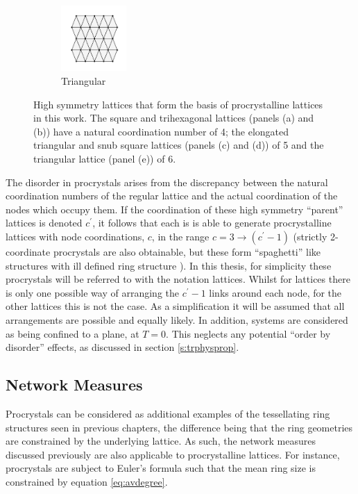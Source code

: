\begin{figure}[bt]
     \vspace{2mm}
     \begin{subfigure}[b]{0.3\textwidth}
         \centering
         \includegraphics[height=2.5cm]{./figures/procrystals/tri.pdf}
         \caption{Triangular}
         \label{fig:symlattri}
     \end{subfigure}
     \hfill

     \caption{High symmetry lattices that form the basis of \td{} procrystalline lattices in this work. The square and trihexagonal lattices (panels (a) and (b)) have a natural coordination number of 4; the elongated triangular and snub square lattices (panels (c) and (d))  of 5 and the triangular lattice (panel (e)) of 6.}
     \label{fig:symlat}
\end{figure}

The disorder in procrystals arises from the discrepancy between the natural coordination numbers of the regular lattice and the actual coordination of the nodes which occupy them.
If the coordination of these high symmetry ``parent'' lattices is denoted $c^\prime$, it follows that each is is able to generate procrystalline lattices with node coordinations, $c$, in the range $c=3\rightarrow \left(c^\prime-1\right)$ (strictly 2\--coordinate procrystals are also obtainable, but these form ``spaghetti'' like structures with ill defined ring structure \cite{Baise2018}).
In this thesis, for simplicity these procrystals will be referred to with the notation lattices.
Whilst for lattices there is only one possible way of arranging the $c^\prime-1$ links around each node, for the other lattices this is not the case.
As a simplification it will be assumed that all arrangements are possible and equally likely.
In addition, systems are considered as being confined to a plane, at $T=0$.
This neglects any potential ``order by disorder'' effects, as discussed in section \ref{s:trphysprop}.


\subsection{Network Measures}

Procrystals can be considered as additional examples of the tessellating ring structures seen in previous chapters, the difference being that the ring geometries are constrained by the underlying lattice. 
As such, the network measures discussed previously are also applicable to procrystalline lattices.  
For instance, procrystals are subject to Euler's formula such that the mean ring size is constrained by equation \eqref{eq:avdegree}.

